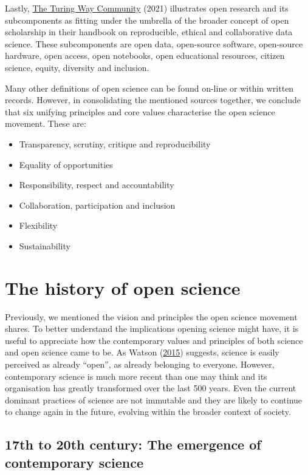 \documentclass[
]{book}
\begin{document}
Lastly, \href{https://the-turing-way.netlify.app/welcome}{The Turing Way Community} (2021) illustrates open research and its subcomponents as fitting under the umbrella of the broader concept of open scholarship in their handbook on reproducible, ethical and collaborative data science. These subcomponents are open data, open-source software, open-source hardware, open access, open notebooks, open educational resources, citizen science, equity, diversity and inclusion.

Many other definitions of open science can be found on-line or within written records. However, in consolidating the mentioned sources together, we conclude that six unifying principles and core values characterise the open science movement. These are:

\begin{itemize}
\item
  Transparency, scrutiny, critique and reproducibility
\item
  Equality of opportunities
\item
  Responsibility, respect and accountability
\item
  Collaboration, participation and inclusion
\item
  Flexibility
\item
  Sustainability
\end{itemize}

\hypertarget{the-history-of-open-science}{%
\section{The history of open science}\label{the-history-of-open-science}}

Previously, we mentioned the vision and principles the open science movement shares. To better understand the implications opening science might have, it is useful to appreciate how the contemporary values and principles of both science and open science came to be. As Watson (\href{https://genomebiology.biomedcentral.com/articles/10.1186/s13059-015-0669-2}{2015}) suggests, science is easily perceived as already ``open'', as already belonging to everyone. However, contemporary science is much more recent than one may think and its organisation has greatly transformed over the last 500 years. Even the current dominant practices of science are not immutable and they are likely to continue to change again in the future, evolving within the broader context of society.

\hypertarget{th-to-20th-century-the-emergence-of-contemporary-science}{%
\subsection{17th to 20th century: The emergence of contemporary science}\label{th-to-20th-century-the-emergence-of-contemporary-science}}
\end{document}
